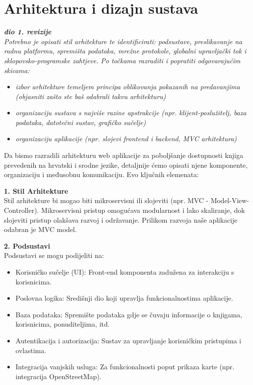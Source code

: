 \chapter{Arhitektura i dizajn sustava}
		
		\textbf{\textit{dio 1. revizije}}\\

		\textit{ Potrebno je opisati stil arhitekture te identificirati: podsustave, preslikavanje na radnu platformu, spremišta podataka, mrežne protokole, globalni upravljački tok i sklopovsko-programske zahtjeve. Po točkama razraditi i popratiti odgovarajućim skicama:}
	\begin{itemize}
		\item 	\textit{izbor arhitekture temeljem principa oblikovanja pokazanih na predavanjima (objasniti zašto ste baš odabrali takvu arhitekturu)}
		\item 	\textit{organizaciju sustava s najviše razine apstrakcije (npr. klijent-poslužitelj, baza podataka, datotečni sustav, grafičko sučelje)}
		\item 	\textit{organizaciju aplikacije (npr. slojevi frontend i backend, MVC arhitektura) }		
	\end{itemize}
 	Da bismo razradili arhitekturu web aplikacije za poboljšanje dostupnosti knjiga prevedenih na hrvatski i srodne jezike, detaljnije ćemo opisati njene komponente, organizaciju i međusobnu komunikaciju. Evo ključnih elemenata:


        \textbf{1. Stil Arhitekture}\\
        Stil arhitekture bi mogao biti mikroservisni ili slojeviti (npr. MVC - Model-View-Controller). Mikroservisni pristup omogućava modularnost i lako skaliranje, dok slojeviti pristup olakšava razvoj i održavanje. Prilikom razvoja naše aplikacije odabran je MVC model.
        
        \textbf{2. Podsustavi}\\

        Podsustavi se mogu podijeliti na:
        \begin{itemize}
		  \item {Korisničko sučelje (UI): Front-end komponenta zadužena za interakciju s korisnicima.}
		  \item {Poslovna logika: Središnji dio koji upravlja funkcionalnostima aplikacije.}
		  \item {Baza podataka: Spremište podataka gdje se čuvaju informacije o knjigama, korisnicima, ponuditeljima, itd.}		
            \item {Autentikacija i autorizacija: Sustav za upravljanje korisničkim pristupima i ovlastima.}	
             \item {Integracija vanjskih usluga: Za funkcionalnosti poput prikaza karte (npr. integracija OpenStreetMap).}		
	   \end{itemize}

